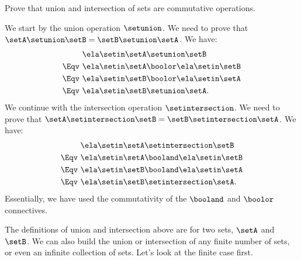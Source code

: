\begin{exercise}
    Prove that union and intersection of sets are commutative operations.
\end{exercise}

\begin{solution}
    We start by the union operation $\setunion$.
    We need to prove that $\setA \setunion \setB = \setB \setunion \setA$.
    We have:
    \begin{equation*}
        \begin{split}
                    & \ela \setin \setA \setunion \setB           \\
            \Eqv \  & \ela \setin \setA \boolor \ela \setin \setB \\
            \Eqv \  & \ela \setin \setB \boolor \ela \setin \setA \\
            \Eqv \  & \ela \setin \setB \setunion \setA.
        \end{split}
    \end{equation*}
    We continue with the intersection operation $\setintersection$.
    We need to prove that $\setA \setintersection \setB = \setB \setintersection \setA$.
    We have:
    \begin{equation*}
        \begin{split}
                    & \ela \setin \setA \setintersection \setB     \\
            \Eqv \  & \ela \setin \setA \booland \ela \setin \setB \\
            \Eqv \  & \ela \setin \setB \booland \ela \setin \setA \\
            \Eqv \  & \ela \setin \setB \setintersection \setA.
        \end{split}
    \end{equation*}
    Essentially, we have used the commutativity of the $\booland$ and $\boolor$ connectives.
\end{solution}

The definitions of union and intersection above are for two sets, $\setA$ and $\setB$.
We can also build the union or intersection of any finite number of sets, or even an infinite collection of sets.
Let's look at the finite case first.

